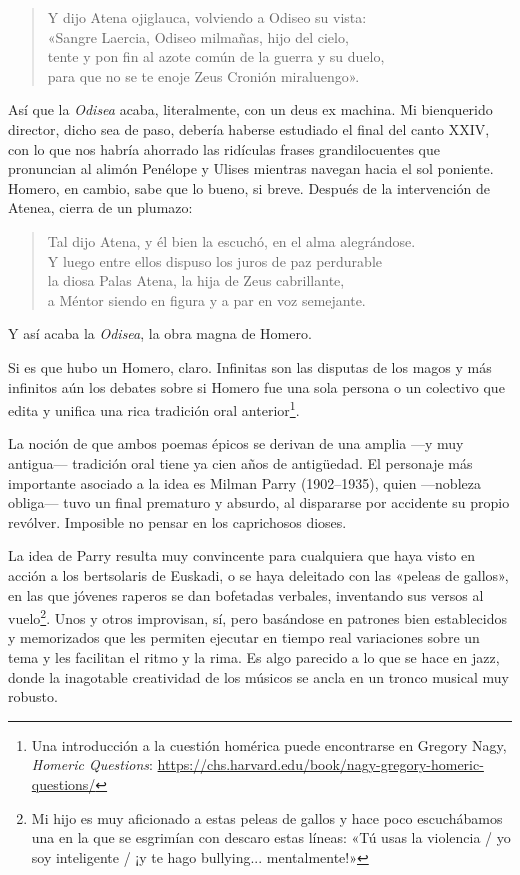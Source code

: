 \begin{verse}
Y dijo Atena ojiglauca, volviendo a Odiseo su vista:\\
«Sangre Laercia, Odiseo milmañas, hijo del cielo,\\
tente y pon fin al azote común de la guerra y su duelo,\\
para que no se te enoje Zeus Cronión miraluengo».
\end{verse}

Así que la \emph{Odisea} acaba, literalmente, con un deus ex machina. Mi bienquerido director, dicho sea de paso, debería haberse estudiado el final del canto XXIV, con lo que nos habría ahorrado las ridículas frases grandilocuentes que pronuncian al alimón Penélope y Ulises mientras navegan hacia el sol poniente. Homero, en cambio, sabe que lo bueno, si breve. Después de la intervención de Atenea, cierra de un plumazo:

\begin{verse}
Tal dijo Atena, y él bien la escuchó, en el alma alegrándose.\\
Y luego entre ellos dispuso los juros de paz perdurable\\
la diosa Palas Atena, la hija de Zeus cabrillante,\\
a Méntor siendo en figura y a par en voz semejante.
\end{verse}

Y así acaba la \emph{Odisea}, la obra magna de Homero.

Si es que hubo un Homero, claro. Infinitas son las disputas de los magos y más infinitos aún los debates sobre si Homero fue una sola persona o un colectivo que edita y unifica una rica tradición oral anterior\footnote{Una introducción a la cuestión homérica puede encontrarse en Gregory Nagy, \emph{Homeric Questions}: \url{https://chs.harvard.edu/book/nagy-gregory-homeric-questions/}}.

La noción de que ambos poemas épicos se derivan de una amplia ---y muy antigua--- tradición oral tiene ya cien años de antigüedad. El personaje más importante asociado a la idea es Milman Parry (1902--1935), quien ---nobleza obliga--- tuvo un final prematuro y absurdo, al dispararse por accidente su propio revólver. Imposible no pensar en los caprichosos dioses.

La idea de Parry resulta muy convincente para cualquiera que haya visto en acción a los bertsolaris de Euskadi, o se haya deleitado con las «peleas de gallos», en las que jóvenes raperos se dan bofetadas verbales, inventando sus versos al vuelo\footnote{Mi hijo es muy aficionado a estas peleas de gallos y hace poco escuchábamos una en la que se esgrimían con descaro estas líneas: «Tú usas la violencia / yo soy inteligente / ¡y te hago bullying... mentalmente!»}. Unos y otros improvisan, sí, pero basándose en patrones bien establecidos y memorizados que les permiten ejecutar en tiempo real variaciones sobre un tema y les facilitan el ritmo y la rima. Es algo parecido a lo que se hace en jazz, donde la inagotable creatividad de los músicos se ancla en un tronco musical muy robusto.

